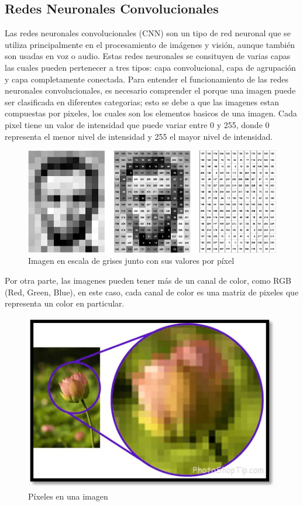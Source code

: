 \subsection{Redes Neuronales Convolucionales}
Las redes neuronales convolucionales (CNN) son un tipo de red neuronal
que se utiliza principalmente en el procesamiento de imágenes y visión, 
aunque también son usadas en voz o audio. Estas redes neuronales se 
consituyen de varias capas las cuales pueden pertenecer a tres tipos:
capa convolucional, capa de agrupación y capa completamente conectada.
Para entender el funcionamiento de las redes neuronales convolucionales,
es necesario comprender el porque una imagen puede ser clasificada en
diferentes categorias; esto se debe a que las imagenes estan compuestas
por pixeles, los cuales son los elementos basicos de una imagen. Cada
pixel tiene un valor de intensidad que puede variar entre 0 y 255,
donde 0 representa el menor nivel de intensidad y 255 el mayor nivel
de intensidad.

\begin{figure}[ht!]
    \centering
    \includegraphics[width=\linewidth]{src/figures/grayscale_image.png}
    \caption{Imagen en escala de grises junto con sus valores por píxel \cite{grayscale_values}}
    \label{fig:grayscale_image}
\end{figure}

\newpage
Por otra parte, las imagenes pueden tener más de un canal
de color, como RGB (Red, Green, Blue), en este caso, cada canal de color
es una matriz de pixeles que representa un color en particular.

\begin{figure}[ht!]
    \centering
    \includegraphics[width=\linewidth]{src/figures/pixels_in_image.png}
    \caption{Píxeles en una imagen \cite{pixels_in_image}}
    \label{fig:pixels_in_image}
\end{figure}

